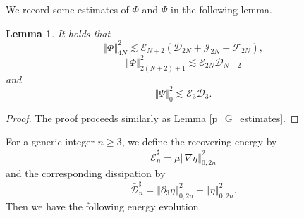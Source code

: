 \documentclass[a4paper,reqno,11pt]{amsart}
\numberwithin{equation}{section}
\providecommand{\norm}[1]{\left\Vert#1\right\Vert}
\providecommand{\sd}[1]{\mathcal{D}_{#1}}
\providecommand{\se}[1]{\mathcal{E}_{#1}}
\providecommand{\ns}[1]{\norm{#1}^2}
\providecommand{\norm}[1]{\left\Vert#1\right\Vert}
\newtheorem{lem}{Lemma}[section]
\begin{document}
We record some estimates of $\Phi$ and $\Psi$ in the following lemma.
\begin{lem}\label{p_G_estimates''}
It holds that
\begin{equation}\label{p_G_e_001''}
 \ns{ \Phi}_{4N} {\lesssim}  \se{N+2}(\sd{2N}+\mathcal{J}_{2N}+ {\mathcal{F}_{2N}} ),
\end{equation}
\begin{equation}\label{p_G_e_002''}
 \ns{\Phi}_{2(N+2)+1} {\lesssim} \se{2N}\sd{N+2}
\end{equation}
and
\begin{equation}\label{Phe_0}
  \ns{ \Psi}_0 {\lesssim} \mathcal{E}_{3} \mathcal{D}_{3} .
\end{equation}
\end{lem}
\begin{proof}
The proof proceeds similarly as Lemma \ref{p_G_estimates}.
\end{proof}

For a generic integer $n\ge 3$, we define the recovering energy by
\begin{equation}
 \bar{\mathcal{E}}^\sharp_{n} = \mu  \norm{\nabla     \eta}_{0,2n}^2
\end{equation}
and the corresponding dissipation by
\begin{equation}
 \bar{\mathcal{D}}_n^\sharp =\norm{  {\partial}_3 \eta}_{0,2n}^2+\norm{      \eta}_{0,2n}^2.
\end{equation}
Then we have the following energy evolution.
\end{document}
